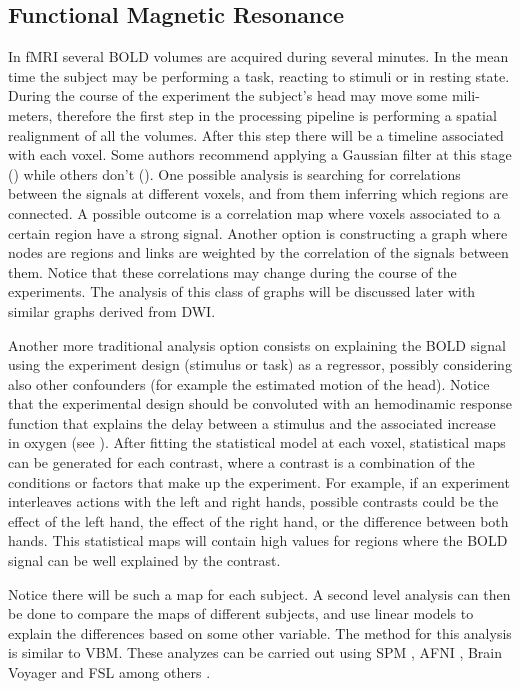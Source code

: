\subsection{Functional Magnetic Resonance}

In fMRI several BOLD volumes are acquired during several minutes. In the mean time the subject may be performing a task, reacting to stimuli or in resting state. During the course of the experiment the subject's head may move some mili-meters, therefore the first step in the processing pipeline is performing a spatial realignment of all the volumes. After this step there will be a timeline associated with each voxel. Some authors recommend applying a Gaussian filter at this stage (\autocite{friston_statistical_2007}) while others don't (\autocite{goebel_brainvoyagerpast_2012}). One possible analysis is searching for correlations between the signals at different voxels, and from them inferring which regions are connected. A possible outcome is a correlation map where voxels associated to a certain region have a strong signal. Another option is constructing a graph where nodes are regions and links are weighted by the correlation of the signals between them. Notice that these correlations may change during the course of the experiments. The analysis of this class of graphs will be discussed later with similar graphs derived from DWI. 

Another more traditional analysis option consists on explaining the BOLD signal using the experiment design (stimulus or task) as a regressor, possibly considering also other confounders (for example the estimated motion of the head). Notice that the experimental design should be convoluted with an hemodinamic response function that explains the delay between a stimulus and the associated increase in oxygen (see \autocite{poldrack_handbook_2011}). After fitting the statistical model at each voxel, statistical maps can be generated for each contrast, where a contrast is a combination of the conditions or factors that make up the experiment. For example, if an experiment interleaves actions with the left and right hands, possible contrasts could be the effect of the left hand, the effect of the right hand, or the difference between both hands. This statistical maps will contain high values for regions where the BOLD signal can be well explained by the contrast. 

Notice there will be such a map for each subject.
A second level analysis can then be done to compare the maps of different subjects, and use linear models to explain the differences based on some other variable. The method for this analysis is similar to VBM. These analyzes can be carried out using SPM \autocite{friston_statistical_2007}, AFNI \autocite{cox_afni:_1996}, Brain Voyager \autocite{goebel_brainvoyagerpast_2012} and FSL \autocite{jenkinson_fsl_2012} among others \autocite{gold_functional_1998}.

